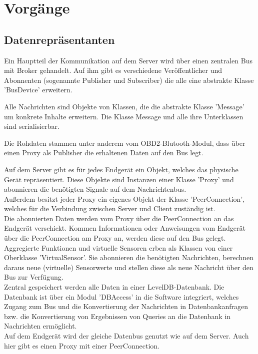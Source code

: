 \documentclass[entwurf.tex]{subfiles}
\begin{document}
\chapter{Vorgänge}
\section{Datenrepräsentanten}
Ein Hauptteil der Kommunikation auf dem Server wird über einen zentralen Bus mit Broker gehandelt. Auf ihm gibt es verschiedene Veröffentlicher und Abonnenten (sogenannte Publisher und Subscriber) die alle eine abstrakte Klasse 'BusDevice' erweitern.

Alle Nachrichten sind Objekte von Klassen, die die abstrakte Klasse 'Message' um konkrete Inhalte erweitern. Die Klasse Message und alle ihre Unterklassen sind serialisierbar.

Die Rohdaten stammen unter anderem vom OBD2-Blutooth-Modul, dass über einen Proxy als Publisher die erhaltenen Daten auf den Bus legt.

Auf dem Server gibt es für jedes Endgerät ein Objekt, welches das physische Gerät repräsentiert. Diese Objekte sind Instanzen einer Klasse 'Proxy' und abonnieren die benötigten Signale auf dem Nachrichtenbus. \\
Außerdem besitzt jeder Proxy ein eigenes Objekt der Klasse 'PeerConnection', welches für die Verbindung zwischen Server und Client zuständig ist. \\
Die abonnierten Daten werden vom Proxy über die PeerConnection an das Endgerät verschickt. Kommen Informationen oder Anweisungen vom Endgerät über die PeerConnection am Proxy an, werden diese auf den Bus gelegt. \\
Aggregierte Funktionen und virtuelle Sensoren erben als Klassen von einer Oberklasse 'VirtualSensor'. Sie abonnieren die benötigten Nachrichten, berechnen daraus neue (virtuelle) Sensorwerte und stellen diese als neue Nachricht über den Bus zur Verfügung. \\

Zentral gespeichert werden alle Daten in einer LevelDB-Datenbank. Die Datenbank ist über ein Modul 'DBAccess' in die Software integriert, welches Zugang zum Bus und die Konvertierung der Nachrichten in Datenbankanfragen bzw. die Konvertierung von Ergebnissen von Queries an die Datenbank in Nachrichten ermöglicht. \\

Auf dem Endgerät wird der gleiche Datenbus genutzt wie auf dem Server. Auch hier gibt es einen Proxy mit einer PeerConnection.
\end{document}
